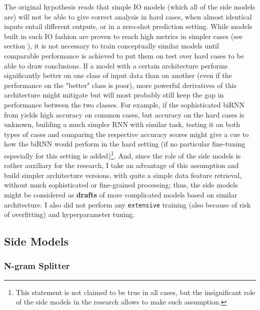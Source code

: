 \documentclass[11pt]{article}
\begin{document}
The original hypothesis reads that simple IO models (which all of the side models are) will not be able to give correct analysis in hard cases, when almost identical inputs entail different outputs, or in a zero-shot prediction setting. While models built in such IO fashion are proven to reach high metrics in simpler cases (see section ), it is not necessary to train conceptually similar models until comparable performance is achieved to put them on test over hard cases to be able to draw conclusions. If a model with a certain architecture performs significantly better on one class of input data than on another (even if the performance on the "better" class is poor), more powerful derivatives of this architecture might mitigate but will most probably still keep the gap in performance between the two classes. For example, if the sophisticated biRNN from \citet{Tuggener2018EvaluatingNS} yields high accuracy on common cases, but accuracy on the hard cases is unknown, building a much simpler RNN with similar task, testing it on both types of cases and comparing the respective accuracy scores might give a cue to how the biRNN would perform in the hard setting (if no particular fine-tuning especially for this setting is added)\footnote{This statement is not claimed to be true in all cases, but the insignificant role of the side models in the research allows to make such assumption.}. And, since the role of the side models is rather auxiliary for the research, I take an advantage of this assumption and build simpler architecture versions, with quite a simple data feature retrieval, without much sophisticated or fine-grained processing; thus, the side models might be considered as \textbf{drafts} of more complicated models based on similar architecture. I also did not perform any \texttt{extensive} training (also because of risk of overfitting) and hyperparameter tuning.

\subsection{Side Models}

\subsubsection{N-gram Splitter}
\end{document}
